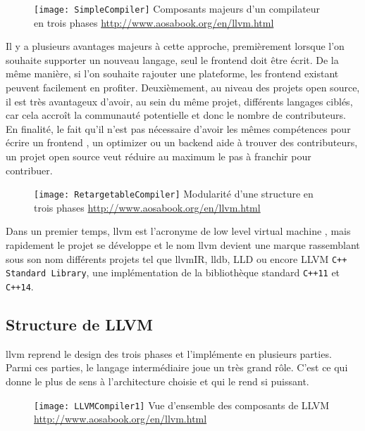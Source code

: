 \begin{figure}[H]
	\centering
	\texttt{[image: SimpleCompiler]}
	{Composants majeurs d'un compilateur en trois phases}
	{\url{http://www.aosabook.org/en/llvm.html}}
	\label{fig:SimpleCompiler}
\end{figure}

Il y a plusieurs avantages majeurs à cette approche, premièrement lorsque l'on souhaite supporter un nouveau langage, seul le \og frontend \fg doit être écrit. De la même manière, si l'on souhaite rajouter une plateforme, les \og frontend \fg existant peuvent facilement en profiter. Deuxièmement, au niveau des projets open source, il est très avantageux d'avoir, au sein du même projet, différents langages ciblés, car cela accroît la communauté potentielle et donc le nombre de contributeurs. En finalité, le fait qu'il n'est pas nécessaire d'avoir les mêmes compétences pour écrire un \og frontend \fg, un \og optimizer \fg ou un \og backend \fg aide à trouver des contributeurs, un projet open source veut réduire au maximum le pas à franchir pour contribuer.

\begin{figure}[H]
	\centering
	\texttt{[image: RetargetableCompiler]}
	{Modularité d'une structure en trois phases}
	{\url{http://www.aosabook.org/en/llvm.html}}
	\label{fig:RetargetableCompiler}
\end{figure}

Dans un premier temps, \gls{llvm} est l'acronyme de \og low level virtual machine \fg, mais rapidement le projet se développe et le nom \gls{llvm} devient une marque rassemblant sous son nom différents projets tel que \gls{llvmIR}, \gls{lldb}, LLD ou encore LLVM \texttt{C++ Standard Library}, une implémentation de la bibliothèque standard \texttt{C++11} et \texttt{C++14}.

\subsection{Structure de LLVM}

\gls{llvm} reprend le design des trois phases et l'implémente en plusieurs parties. Parmi ces parties, le langage intermédiaire joue un très grand rôle. C'est ce qui donne le plus de sens à l'architecture choisie et qui le rend si puissant.

\begin{figure}[H]
	\centering
	\texttt{[image: LLVMCompiler1]}
	{Vue d'ensemble des composants de LLVM}
	{\url{http://www.aosabook.org/en/llvm.html}}
	\label{fig:LLVMCompiler1}
\end{figure}

